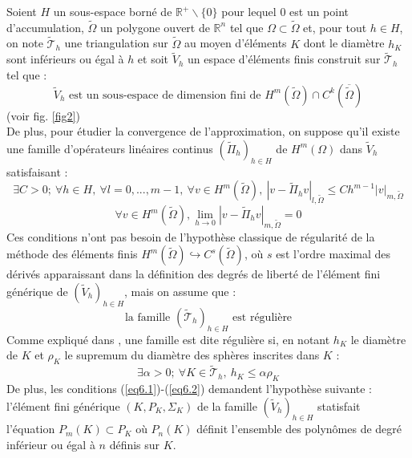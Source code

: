 \documentclass{article}
\begin{document}
Soient $H$ un sous-espace borné de $\mathbb{R}^+\backslash\{0\}$ pour lequel $0$ est un point d'accumulation, $\tilde{\Omega}$ un polygone ouvert de $\mathbb{R}^n$ tel que $\Omega\subset\tilde{\Omega}$ et, pour tout $h\in H$, on note $\tilde{\mathscr{T}}_h$ une triangulation sur $\tilde{\Omega}$ au moyen d'éléments $K$ dont le diamètre $h_K$ sont inférieurs ou égal à $h$ et soit $\tilde{V}_h$ un espace d'éléments finis construit sur $\tilde{\mathscr{T}}_h$ tel que :
\begin{equation} \label{eq5} \tilde{V}_h \text{ est un sous-espace de dimension fini de } H^m\left(\tilde{\Omega}\right)\cap C^k\left(\overline{\tilde{\Omega}}\right) \end{equation}
(voir fig. \ref{fig2})
\\
De plus, pour étudier la convergence de l'approximation, on suppose qu'il existe une famille d'opérateurs linéaires continus $(\tilde{\Pi}_h)_{h\in H}$ de $H^m(\Omega)$ dans $\tilde{V}_h$ satisfaisant :
\begin{equation} \label{eq6.1}
	\exists C>0;\ \forall h\in H,\ \forall l=0,...,m-1,\ \forall v\in H^m(\tilde{\Omega}),\ \left| v-\tilde{\Pi}_h v\right|_{l,\tilde{\Omega}}\leq Ch^{m-1}|v|_{m,\tilde{\Omega}}
\end{equation}
\begin{equation} \label{eq6.2}
	\forall v\in H^m(\tilde{\Omega}), \lim_{h\to 0} \left|v-\tilde{\Pi}_h v \right|_{m,\tilde{\Omega}}=0
\end{equation}
Ces conditions n'ont pas besoin de l'hypothèse classique de régularité de la méthode des éléments finis $H^m(\tilde{\Omega})\hookrightarrow C^s(\tilde{\Omega})$, où $s$ est l'ordre maximal des dérivés apparaissant dans la définition des degrés de liberté de l'élément fini générique de $(\tilde{V}_h)_{h\in H}$, mais on assume que :
\begin{equation} \label{eq7} \text{la famille } (\tilde{\mathscr{T}}_h)_{h\in H} \text{ est régulière} \end{equation}
Comme expliqué dans \cite{ciarlet72gal}, une famille est dite régulière si, en notant $h_K$ le diamètre de $K$ et $\rho_K$ le supremum du diamètre des sphères inscrites dans $K$ :
	\[\exists \alpha>0;\ \forall K\in\tilde{\mathscr{T}}_h,\ h_K\leq \alpha \rho_K\]
De plus, les conditions (\ref{eq6.1})-(\ref{eq6.2}) demandent l'hypothèse suivante : l'élément fini générique $(K,P_K,\Sigma_K)$ de la famille $(\tilde{V}_h)_{h\in H}$ statisfait l'équation $P_m(K)\subset P_K$ où $P_n(K)$ définit l'ensemble des polynômes de degré inférieur ou égal à $n$ définis sur $K$.
\end{document}
